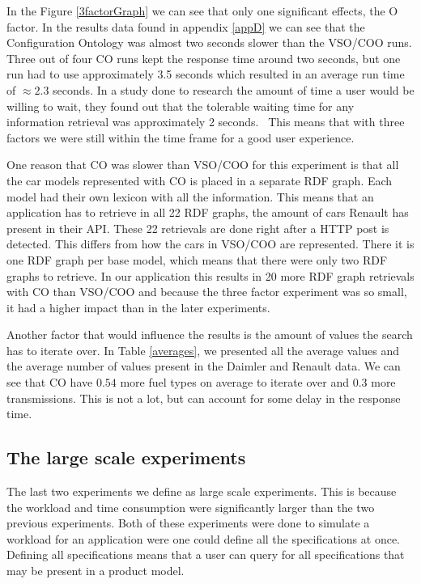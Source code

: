 \documentclass{llncs}
\begin{document}
In the Figure \ref{3factorGraph} we can see that only one significant
effects, the O factor. In the results data found in appendix
\ref{appD} we can see that the Configuration Ontology was almost two
seconds slower than the VSO/COO runs.  Three out of four CO runs kept
the response time around two seconds, but one run had to use
approximately 3.5 seconds which resulted in an average run time of
$\approx2.3$ seconds.  In a study done to research the amount of time
a user would be willing to wait, they found out that the tolerable
waiting time for any information retrieval was approximately 2
seconds.~\cite{waitTime} This means that with three factors we were
still within the time frame for a good user experience.

One reason that CO was slower than VSO/COO for this experiment is that
all the car models represented with CO is placed in a separate RDF
graph. Each model had their own lexicon with all the information.
This means that an application has to retrieve in all 22 RDF graphs,
the amount of cars Renault has present in their API. These 22
retrievals are done right after a HTTP post is detected. This differs
from how the cars in VSO/COO are represented. There it is one RDF
graph per base model, which means that there were only two RDF graphs
to retrieve.  In our application this results in 20 more RDF graph
retrievals with CO than VSO/COO and because the three factor
experiment was so small, it had a higher impact than in the later
experiments.

Another factor that would influence the results is the amount of
values the search has to iterate over.  In Table \ref{averages}, we
presented all the average values and the average number of values
present in the Daimler and Renault data. We can see that CO have
$0.54$ more fuel types on average to iterate over and $0.3$ more
transmissions. This is not a lot, but can account for some delay in
the response time.

\subsection{The large scale experiments}
The last two experiments we define as large scale experiments. This is
because the workload and time consumption were significantly larger
than the two previous experiments. Both of these experiments were done
to simulate a workload for an application were one could define all
the specifications at once. Defining all specifications means that a
user can query for all specifications that may be present in a product
model.
\end{document}
